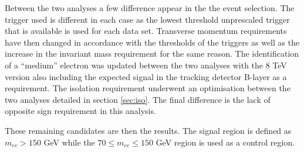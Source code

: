 	Between the two analyses a few difference appear in the the event selection. The trigger used is different in each case as the lowest threshold unprescaled trigger that is available is used for each data set. Transverse momentum requirements have then changed in accordance with the thresholds of the triggers as well as the increase in the invariant mass requirement for the same reason. The identification of a ``medium'' electron was updated between the two analyses with the 8 TeV version also including the expected signal in the tracking detector B-layer as a requirement. The isolation requirement underwent an optimisation between the two analyses detailed in section \ref{sec:iso}. The final difference is the lack of opposite sign requirement in this analysis.

	These remaining candidates are then the results. The signal region is defined as $m_{ee} > 150$ GeV while the $70 \leq m_{ee} \leq 150$ GeV region is used as a control region.

